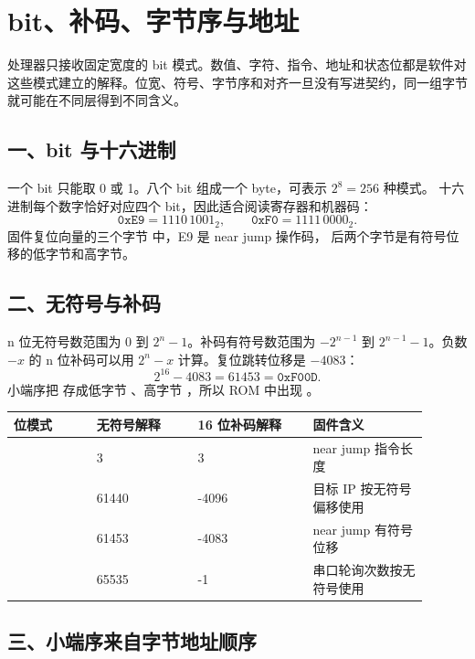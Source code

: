 \chapter{bit、补码、字节序与地址}

\begin{keyidea}
处理器只接收固定宽度的 bit 模式。数值、字符、指令、地址和状态位都是软件对
这些模式建立的解释。位宽、符号、字节序和对齐一旦没有写进契约，同一组字节
就可能在不同层得到不同含义。
\end{keyidea}

\section{一、bit 与十六进制}

一个 bit 只能取 0 或 1。八个 bit 组成一个 byte，可表示 \(2^8=256\) 种模式。
十六进制每个数字恰好对应四个 bit，因此适合阅读寄存器和机器码：
\[
\texttt{0xE9}=1110\,1001_2,\qquad
\texttt{0xF0}=1111\,0000_2.
\]
固件复位向量的三个字节  中，E9 是 near jump 操作码，
后两个字节是有符号位移的低字节和高字节。

\section{二、无符号与补码}

n 位无符号数范围为 0 到 \(2^n-1\)。补码有符号数范围为
\(-2^{n-1}\) 到 \(2^{n-1}-1\)。负数 \(-x\) 的 n 位补码可以用
\(2^n-x\) 计算。复位跳转位移是 \(-4083\)：
\[
2^{16}-4083=61453=\texttt{0xF00D}.
\]
小端序把  存成低字节 、高字节 ，所以
ROM 中出现 。

\begin{longtable}{L{0.18\linewidth}L{0.22\linewidth}L{0.25\linewidth}L{0.25\linewidth}}
\toprule
位模式 & 无符号解释 & 16 位补码解释 & 固件含义 \\
\midrule
{} & 3 & 3 & near jump 指令长度 \\
 & 61440 & -4096 & 目标 IP 按无符号偏移使用 \\
 & 61453 & -4083 & near jump 有符号位移 \\
 & 65535 & -1 & 串口轮询次数按无符号使用 \\
\bottomrule
\end{longtable}

\section{三、小端序来自字节地址顺序}

